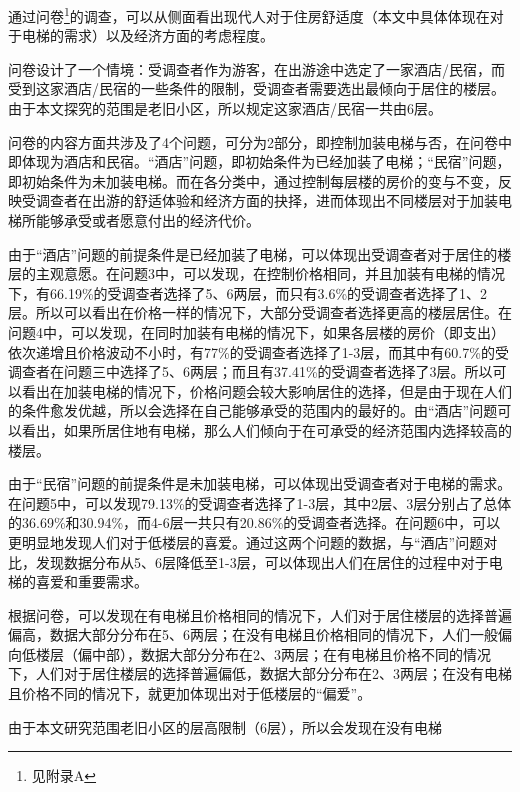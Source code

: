 \documentclass[lang=cn,a4paper]{elegantpaper}
\begin{document}
    通过问卷\footnote{见附录A}的调查，可以从侧面看出现代人对于住房舒适度（本文中具体体现在对于电梯的需求）以及经济方面的考虑程度。

    问卷设计了一个情境：受调查者作为游客，在出游途中选定了一家酒店/民宿，而受到这家酒店/民宿的一些条件的限制，受调查者需要选出最倾向于居住的楼层。由于本文探究的范围是老旧小区，所以规定这家酒店/民宿一共由6层。

    问卷的内容方面共涉及了4个问题，可分为2部分，即控制加装电梯与否，在问卷中即体现为酒店和民宿。“酒店”问题，即初始条件为已经加装了电梯；“民宿”问题，即初始条件为未加装电梯。而在各分类中，通过控制每层楼的房价的变与不变，反映受调查者在出游的舒适体验和经济方面的抉择，进而体现出不同楼层对于加装电梯所能够承受或者愿意付出的经济代价。
    
    由于“酒店”问题的前提条件是已经加装了电梯，可以体现出受调查者对于居住的楼层的主观意愿。在问题3中，可以发现，在控制价格相同，并且加装有电梯的情况下，有66.19\%的受调查者选择了5、6两层，而只有3.6\%的受调查者选择了1、2层。所以可以看出在价格一样的情况下，大部分受调查者选择更高的楼层居住。在问题4中，可以发现，在同时加装有电梯的情况下，如果各层楼的房价（即支出）依次递增且价格波动不小时，有77\%的受调查者选择了1-3层，而其中有60.7\%的受调查者在问题三中选择了5、6两层；而且有37.41\%的受调查者选择了3层。所以可以看出在加装电梯的情况下，价格问题会较大影响居住的选择，但是由于现在人们的条件愈发优越，所以会选择在自己能够承受的范围内的最好的。由“酒店”问题可以看出，如果所居住地有电梯，那么人们倾向于在可承受的经济范围内选择较高的楼层。

    由于“民宿”问题的前提条件是未加装电梯，可以体现出受调查者对于电梯的需求。在问题5中，可以发现79.13\%的受调查者选择了1-3层，其中2层、3层分别占了总体的36.69\%和30.94\%，而4-6层一共只有20.86\%的受调查者选择。在问题6中，可以更明显地发现人们对于低楼层的喜爱。通过这两个问题的数据，与“酒店”问题对比，发现数据分布从5、6层降低至1-3层，可以体现出人们在居住的过程中对于电梯的喜爱和重要需求。

    根据问卷，可以发现在有电梯且价格相同的情况下，人们对于居住楼层的选择普遍偏高，数据大部分分布在5、6两层；在没有电梯且价格相同的情况下，人们一般偏向低楼层（偏中部），数据大部分分布在2、3两层；在有电梯且价格不同的情况下，人们对于居住楼层的选择普遍偏低，数据大部分分布在2、3两层；在没有电梯且价格不同的情况下，就更加体现出对于低楼层的“偏爱”。

    由于本文研究范围老旧小区的层高限制（6层），所以会发现在没有电梯
\end{document}
